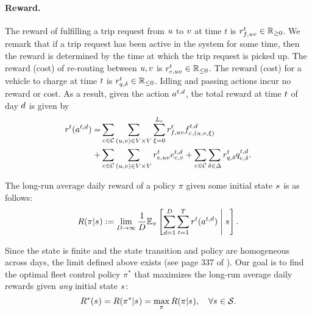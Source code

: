 \paragraph{Reward.} The reward of fulfilling a trip request from $\origin$ to $\destination$ at time $t$ is $\tripfulfillreward{,\origin\destination}{\time} \in \mathbb{R}_{\geq 0}$. We remark that if a trip request has been active in the system for some time, then the reward is determined by the time at which the trip request is picked up. The reward (cost) of re-routing between $\origin, \destination$ is $\reroutingreward{,\origin\destination}{\time} \in \mathbb{R}_{\leq 0}$. The reward (cost) for a vehicle to charge at time $\time$ is $\chargingreward{,\type}{\time} \in \mathbb{R}_{\leq 0}$. Idling and passing actions incur no reward or cost. As a result, given the action $\jointaction{}{\time, \day}$, the total reward at time $\time$ of day $\day$ is given by 
 \begin{align} \label{eq:setup-reward}
     \reward{}{\time}(\jointaction{}{\time,\day}) =& 
    \sum_{\cartype{} \in \Cartype} \sum_{(\origin, \destination) \in \Region \times \Region}\sum_{\tripactivetime = 0}^{\Lc} \tripfulfillreward{,\origin\destination}{\time} \jointtripfulfillaction{\cartype{}, (\origin, \destination, \xi)}{\time,\day} \notag \\ 
    +& \sum_{\cartype{} \in \Cartype} \sum_{(\origin, \destination) \in \Region \times \Region}
    \reroutingreward{,\origin\destination}{\time} \jointreroutingaction{\cartype{}, \destination}{\time,\day} + \sum_{\cartype{} \in \Cartype}\sum_{\type \in \Type} \chargingreward{,\type}{\time} \jointchargingaction{\cartype{},\type}{\time,\day}.
 \end{align}

The long-run average daily reward of a policy $\pi$ given some initial state $\state{}{}$ is as follows:
\begin{equation} \label{eq:long-run-avg-reward}
    R(\pi \vert \state{}{}) := \lim_{\totaldays \rightarrow \infty} \frac{1}{\totaldays} \mathbb{E}_{\pi}\left[\sum_{\day = 1}^{\totaldays} \sum_{\time = 1}^{\Horizon} \reward{}{\time}(\jointaction{}{\time,\day}) \Biggm\lvert \state{}{} \right].
\end{equation}

Since the state is finite and the state transition and policy are homogeneous across days, the limit defined above exists (see page 337 of \cite{PutermanMDP}). Our goal is to find the optimal fleet control policy $\pi^*$ that maximizes the long-run average daily rewards given {\em any} initial state $\state{}{}$: 
\begin{equation} \label{eq:opt-long-run-avg-reward}
    R^*(\state{}{}) =  R(\pi^* \vert \state{}{}) = \max_{\pi} R(\pi \vert \state{}{}),\quad \forall \state{}{} \in \mathcal{S}.
\end{equation}

